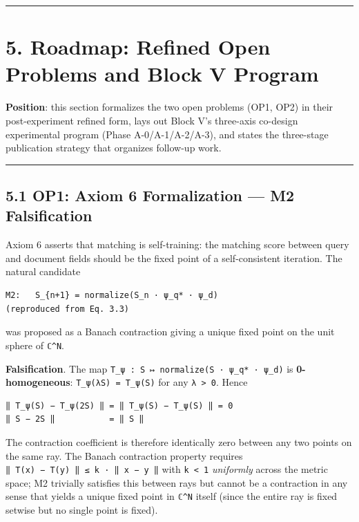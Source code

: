 \documentclass[
]{article}
\begin{document}
\begin{center}\rule{0.5\linewidth}{0.5pt}\end{center}

\hypertarget{roadmap-refined-open-problems-and-block-v-program}{%
\section{5. Roadmap: Refined Open Problems and Block V
Program}\label{roadmap-refined-open-problems-and-block-v-program}}

\textbf{Position}: this section formalizes the two open problems (OP1,
OP2) in their post-experiment refined form, lays out Block V's
three-axis co-design experimental program (Phase A-0/A-1/A-2/A-3), and
states the three-stage publication strategy that organizes follow-up
work.

\begin{center}\rule{0.5\linewidth}{0.5pt}\end{center}

\hypertarget{op1-axiom-6-formalization-m2-falsification}{%
\subsection{5.1 OP1: Axiom 6 Formalization --- M2
Falsification}\label{op1-axiom-6-formalization-m2-falsification}}

Axiom 6 asserts that matching is self-training: the matching score
between query and document fields should be the fixed point of a
self-consistent iteration. The natural candidate

\begin{verbatim}
M2:   S_{n+1} = normalize(S_n · ψ_q* · ψ_d)                                  (reproduced from Eq. 3.3)
\end{verbatim}

was proposed as a Banach contraction giving a unique fixed point on the
unit sphere of \texttt{ℂ\^{}N}.

\textbf{Falsification}. The map
\texttt{T\_ψ\ :\ S\ ↦\ normalize(S\ ·\ ψ\_q*\ ·\ ψ\_d)} is
\textbf{0-homogeneous}: \texttt{T\_ψ(λS)\ =\ T\_ψ(S)} for any
\texttt{λ\ \textgreater{}\ 0}. Hence

\begin{verbatim}
‖ T_ψ(S) − T_ψ(2S) ‖ = ‖ T_ψ(S) − T_ψ(S) ‖ = 0
‖ S − 2S ‖           = ‖ S ‖
\end{verbatim}

The contraction coefficient is therefore identically zero between any
two points on the same ray. The Banach contraction property requires
\texttt{‖\ T(x)\ −\ T(y)\ ‖\ ≤\ k\ ·\ ‖\ x\ −\ y\ ‖} with
\texttt{k\ \textless{}\ 1} \emph{uniformly} across the metric space; M2
trivially satisfies this between rays but cannot be a contraction in any
sense that yields a unique fixed point in \texttt{ℂ\^{}N} itself (since
the entire ray is fixed setwise but no single point is fixed).
\end{document}
